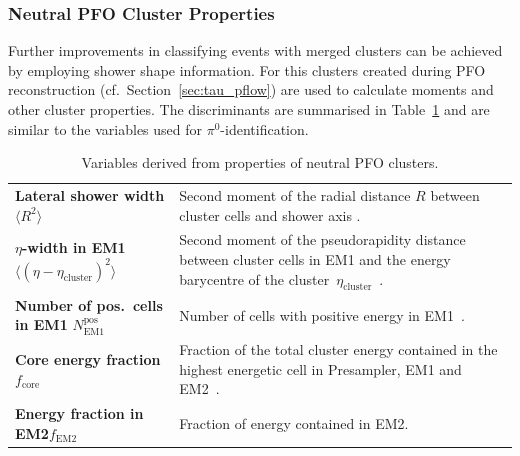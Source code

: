 \subsubsection{Neutral PFO Cluster Properties}

Further improvements in classifying events with merged clusters can be achieved
by employing shower shape information. For this clusters created during PFO
reconstruction (cf.\ Section~\ref{sec:tau_pflow}) are used to calculate moments
and other cluster properties.
The discriminants are summarised in Table~\ref{tab:cluster_variables} and are
similar to the variables used for $\pi^0$-identification.

\begin{table}[htb]
  \centering
  {\def\arraystretch{1.4}\small
  \begin{tabular}{p{4.5cm}p{9cm}}
    \toprule
    \textbf{Lateral shower width}\newline$\langle R^2 \rangle$ &
    Second moment of the radial distance $R$ between cluster cells and shower axis \cite{atlas_topoclustering}. \\

    \textbf{$\eta$-width in EM1}\newline$\langle (\eta - \eta_\text{cluster})^2\rangle$ &
    Second moment of the pseudorapidity distance between cluster cells in EM1
    and the energy barycentre of the cluster~$\eta_\text{cluster}$~\cite{atlas:taurec:decaymodes}. \\

    \textbf{Number of pos.\ cells in EM1} $N_\text{EM1}^\text{pos}$ &
    Number of cells with positive energy in EM1~\cite{atlas:taurec:decaymodes}.\\

    \textbf{Core energy fraction}\newline$f_\text{core}$ &
    Fraction of the total cluster energy contained in the highest energetic cell
    in Presampler, EM1 and EM2~\cite{atlas_topoclustering}. \\

    \textbf{Energy fraction in EM2}\newline$f_\text{EM2}$ &
    Fraction of energy contained in EM2.\\
    \bottomrule
  \end{tabular}
  }
  \caption{Variables derived from properties of neutral PFO clusters.}
  \label{tab:cluster_variables}
\end{table}

